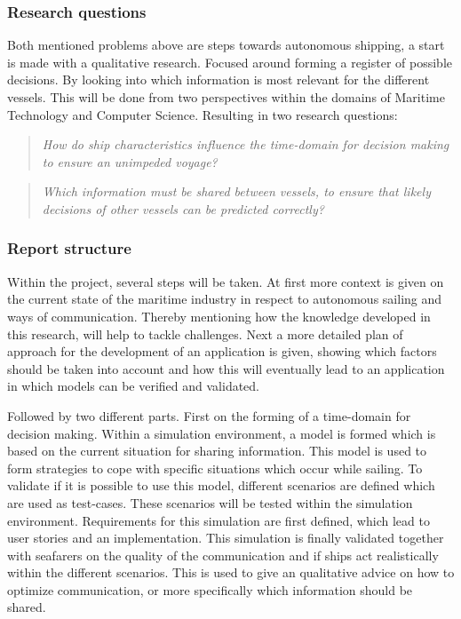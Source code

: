 
\subsubsection*{Research questions}
Both mentioned problems above are steps towards autonomous shipping, a start is made with a qualitative research. Focused around forming a register of possible decisions. By looking into which information is most relevant for the different vessels. This will be done from two perspectives within the domains of Maritime Technology and Computer Science. Resulting in two research questions:

\begin{quotation}
	\emph{How do ship characteristics influence the time-domain for decision making to ensure an unimpeded voyage?} 
\end{quotation}

\begin{quotation}
	\emph{Which information must be shared between vessels, to ensure that likely decisions of other vessels can be predicted correctly?}
\end{quotation}

\subsubsection*{Report structure}
Within the project, several steps will be taken. At first more context is given on the current state of the maritime industry in respect to autonomous sailing and ways of communication. Thereby mentioning how the knowledge developed in this research, will help to tackle challenges.
Next a more detailed plan of approach for the development of an application is given, showing which factors should be taken into account and how this will eventually lead to an application in which models can be verified and validated.

Followed by two different parts. First on the forming of a time-domain for decision making. Within a simulation environment, a model is formed which is based on the current situation for sharing information. This model is used to form strategies to cope with specific situations which occur while sailing. To validate if it is possible to use this model, different scenarios are defined which are used as test-cases. These scenarios will be tested within the simulation environment. Requirements for this simulation are first defined, which lead to user stories and an implementation.
This simulation is finally validated together with seafarers on the quality of the communication and if ships act realistically within the different scenarios. This is used to give an qualitative advice on how to optimize communication, or more specifically which information should be shared.

